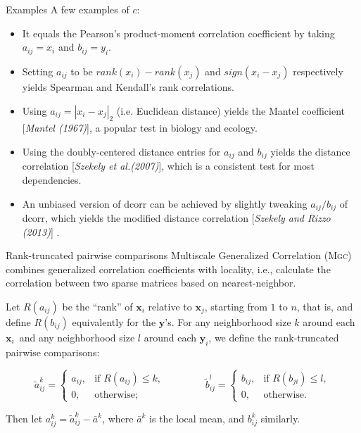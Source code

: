 \documentclass{beamer}
\newcommand{\G}{c}
\providecommand{\mb}[1]{\boldsymbol{#1}}
\providecommand{\sct}[1]{{\normalfont\textsc{#1}}}
\providecommand{\mt}[1]{\widetilde{#1}}
\newcommand{\Mgc}{\sct{Mgc}}
\newcommand{\mby}{\ensuremath{\mb{y}}}
\begin{document}
\begin{frame}{Examples}
A few examples of $\G$:
\begin{itemize}[<+->]
\item It equals the Pearson's product-moment correlation coefficient by taking $a_{ij}=x_i$ and $b_{ij}=y_i$.
\item Setting $a_{ij}$ to be $rank(x_i)-rank(x_j)$ and $sign(x_i-x_j)$ respectively yields Spearman and Kendall's rank correlations.
\item Using $a_{ij}=|x_i-x_j|_{2}$ (i.e. Euclidean distance) yields the Mantel coefficient [\textit{Mantel (1967)}]\cite{Mantel1967}, a popular test in biology and ecology.
\item Using the doubly-centered distance entries for $a_{ij}$ and $b_{ij}$ yields the distance correlation [\textit{Szekely et al.(2007)}]\cite{SzekelyRizzoBakirov2007}, which is a consistent test for most dependencies. 
\item An unbiased version of dcorr can be achieved by slightly tweaking $a_{ij}/b_{ij}$ of dcorr, which yields the modified distance correlation [\textit{Szekely and Rizzo (2013)}] \cite{SzekelyRizzo2013a}.
\end{itemize}
\end{frame}

\begin{frame}{Rank-truncated pairwise comparisons}
Multiscale Generalized Correlation (\Mgc) combines generalized correlation coefficients with locality, i.e., calculate the correlation between two sparse matrices based on nearest-neighbor.

\pause
\medskip
Let $R(a_{ij})$  be the ``rank'' of $\mb{x}_i$ relative to $\mb{x}_j$, starting from $1$ to $n$, that is, and define $R(b_{ij})$ equivalently for the \mby's. For any neighborhood size $k$ around each $\mb{x}_i$~and any neighborhood size $l$ around each $\mb{y}_i$, we define the rank-truncated pairwise comparisons:

\pause
\begin{equation}
\label{localCoef2}
    \mt{a}_{ij}^k=
    \begin{cases}
      a_{ij}, & \text{if } R(a_{ij}) \leq k, \\
      0, & \text{otherwise};
    \end{cases} \qquad \qquad
    \mt{b}_{ij}^l=
    \begin{cases}
      b_{ij}, & \text{if } R(b_{ji}) \leq l, \\
      0, & \text{otherwise}.
    \end{cases}
\end{equation}

\pause
Then let $a^k_{ij}=\mt{a}^k_{ij} - \bar{a}^k$, where $\bar{a}^k$ is the local mean, and $b^k_{ij}$ similarly.
\end{frame}
\end{document}
